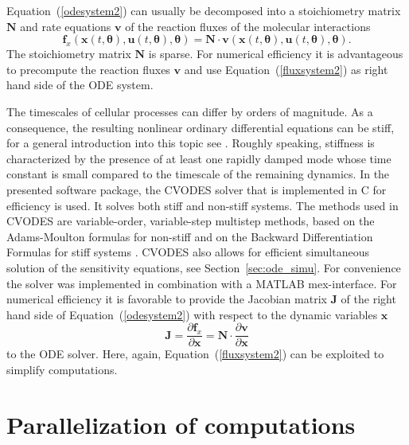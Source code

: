 \documentclass[12pt,a4paper]{scrartcl}
\newcommand{\dd}[2]{\frac{\partial #1}{\partial #2}}
\begin{document}
Equation~(\ref{odesystem2}) can usually be decomposed into a stoichiometry matrix $
\mathbf{N}$ and rate equations $\mathbf{v}$ of the reaction fluxes of the molecular 
interactions
\begin{equation}
	\mathbf{f}_{x}(\mathbf{x}(t, \boldsymbol{\theta}), \mathbf{u}(t, \boldsymbol{\theta}), 
\boldsymbol{\theta}) = \mathbf{N} \cdot \mathbf{v}(\mathbf{x}(t, \boldsymbol{\theta}), 
\mathbf{u}(t, \boldsymbol{\theta}), \boldsymbol{\theta}). \label{fluxsystem2}
\end{equation}
The stoichiometry matrix $\mathbf{N}$ is sparse. For numerical efficiency it is 
advantageous to precompute the reaction fluxes $\mathbf{v}$ and use 
Equation~(\ref{fluxsystem2}) as right hand side of the ODE system. 

The timescales of cellular processes can differ by orders of magnitude. As a 
consequence, the resulting nonlinear ordinary differential equations can be stiff, for a 
general introduction into this topic see \citet{Lambert:1977fk}. Roughly speaking, stiffness 
is characterized by the presence of at least one rapidly damped mode whose time 
constant is small compared to the timescale of the remaining dynamics. In the presented 
software package, the CVODES solver \citep{Hindmarsh:2005fb} that is implemented in C for 
efficiency is used. It solves both stiff and non-stiff systems. The methods used in CVODES 
are variable-order, variable-step multistep methods, based on the Adams-Moulton 
formulas for non-stiff and on the Backward Differentiation Formulas for stiff systems 
\citep{Byrne:1975uq}. CVODES also allows for efficient simultaneous solution of the 
sensitivity equations, see Section~\ref{sec:ode_simu}. For convenience the solver was 
implemented in combination with a MATLAB mex-interface. For numerical efficiency it is 
favorable to provide the Jacobian matrix $\mathbf{J}$ of the right hand side of 
Equation~(\ref{odesystem2}) with respect to the dynamic variables $\mathbf{x}$ 
\begin{equation}
	\mathbf{J} = \dd{\mathbf{f}_{x}}{\mathbf{x}} = \mathbf{N} \cdot \dd{\mathbf{v}}
{\mathbf{x}}\label{jac_mat}
\end{equation}
to the ODE solver. Here, again, Equation~(\ref{fluxsystem2}) can be exploited to simplify 
computations.

\section{Parallelization of computations} \label{sec:parallel}
\end{document}
